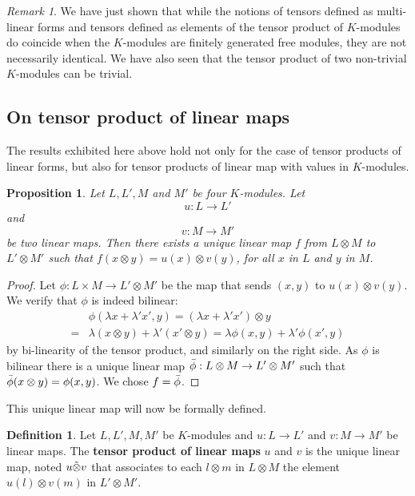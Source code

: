 \documentclass{report}
\newtheorem{prop}{Proposition}
\theoremstyle{definition}
\newtheorem{defin}{Definition}
\theoremstyle{remark}
\newtheorem{remark}{Remark}
\begin{document}
\begin{remark}
    We have just shown that while the notions of tensors defined as multi-linear forms and tensors defined as elements of the tensor product of $K$-modules do coincide when the $K$-modules are finitely generated free modules, they are not necessarily identical. We have also seen that the tensor product of two non-trivial $K$-modules can be trivial. 
\end{remark}



\subsection{On tensor product of linear maps}


The results exhibited here above hold not only for the case of tensor products of linear forms, but also for tensor products of linear map with values in $K$-modules. 

\begin{prop}
    Let $L,L',M$ and $M'$ be four $K$-modules. 
    Let $$u : L \to L'$$ and $$v: M \to M' $$ be two linear maps. Then there exists a unique linear map $f$ from $L \otimes M $ to $L' \otimes M'$ such that $f(x \otimes y) = u(x) \otimes v(y)$, for all $x$ in $L$ and $y$ in $M$.
\end{prop}
    
\begin{proof}
    Let $\phi : L \times M \to L' \otimes M'$ be the map that sends $(x,y)$ to $u(x)\otimes v(y)$. We verify that $\phi$ is indeed bilinear: 
    \begin{equation*}
    \begin{split}
       & \phi (\lambda x + \lambda'x',y) = (\lambda x + \lambda' x')\otimes y \\ = 
       & \lambda(x \otimes y) + \lambda' (x'\otimes y) = \lambda\phi(x,y) + \lambda'\phi(x',y)
    \end{split}    
    \end{equation*}
    by bi-linearity of the tensor product, and similarly on the right side. As $\phi$ is bilinear there is a unique linear map $\Bar{\phi}:L\otimes M \to L' \otimes M'$ such that $\Bar{\phi} (x\otimes y) = \phi(x,y)$. We chose $f = \Bar{\phi}$.
\end{proof}
    This unique linear map will now be formally defined. 
\begin{defin}
        Let $L,L',M,M'$ be $K$-modules and $u: L \to L'$ and $v: M \to M'$ be linear maps. The \textbf{tensor product of linear maps} $u$ and $v$ is the unique linear map, noted $u \Tilde{\otimes} v$ that associates to each $l\otimes m$ in $L \otimes M$ the element $u(l) \otimes v(m)$ in $L' \otimes M'$. 
\end{defin}
\end{document}
